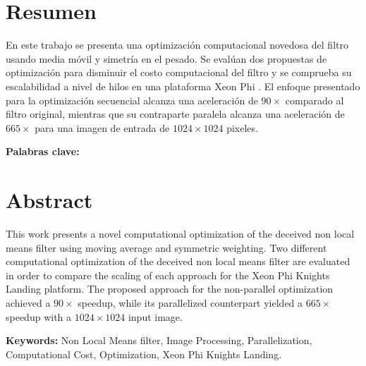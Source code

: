 \chapter*{Resumen}
\thispagestyle{empty}

En este trabajo se presenta una optimizaci\'on computacional novedosa del filtro  usando media móvil y simetr\'ia en el pesado. Se evalúan dos propuestas de optimización para disminuir el costo computacional del filtro y se comprueba su escalabilidad a nivel de hilos en una plataforma  Xeon Phi . El enfoque presentado para la optimización secuencial alcanza una aceleración de $90\times$ comparado al filtro original, mientras que su contraparte paralela alcanza una aceleración de $665\times$ para una imagen de entrada de $1024\times1024$ pixeles.

\bigskip

\textbf{Palabras clave:} \scriptKeywords

\clearpage
\chapter*{Abstract}
\thispagestyle{empty}

This work presents a novel computational optimization of the deceived non local means filter using moving average and symmetric weighting. Two different computational optimization of the deceived non local means filter are evaluated in order to compare the scaling of each approach for the Xeon Phi Knights Landing platform. The proposed approach for the non-parallel optimization achieved a $90\times$ speedup, while its parallelized counterpart yielded a $665\times$ speedup with a $1024\times1024$ input image. 

\bigskip

\textbf{Keywords:} Non Local Means filter, Image Processing, Parallelization, Computational Cost, Optimization, Xeon Phi Knights Landing.

\cleardoublepage

